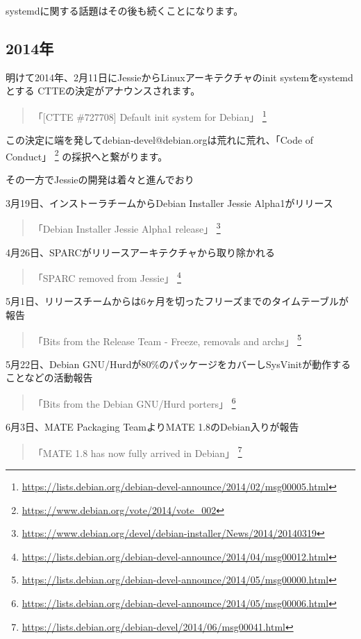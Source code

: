 \documentclass[mingoth,a4paper]{jsarticle}
\begin{document}
systemdに関する話題はその後も続くことになります。


\subsection{2014年}

明けて2014年、2月11日にJessieからLinuxアーキテクチャのinit systemをsystemdとする
CTTEの決定がアナウンスされます。
\begin{quote}
  「[CTTE \#727708] Default init system for Debian」
  \footnote{\url{https://lists.debian.org/debian-devel-announce/2014/02/msg00005.html}}
\end{quote}

この決定に端を発してdebian-devel@debian.orgは荒れに荒れ、「Code of Conduct」
\footnote{\url{https://www.debian.org/vote/2014/vote_002}}
の採択へと繋がります。

その一方でJessieの開発は着々と進んでおり

3月19日、インストーラチームからDebian Installer Jessie Alpha1がリリース
\begin{quote}
  「Debian Installer Jessie Alpha1 release」
  \footnote{\url{https://www.debian.org/devel/debian-installer/News/2014/20140319}}
\end{quote}

4月26日、SPARCがリリースアーキテクチャから取り除かれる
\begin{quote}
  「SPARC removed from Jessie」
  \footnote{\url{https://lists.debian.org/debian-devel-announce/2014/04/msg00012.html}}
\end{quote}

5月1日、リリースチームからは6ヶ月を切ったフリーズまでのタイムテーブルが報告
\begin{quote}
  「Bits from the Release Team - Freeze, removals and archs」
  \footnote{\url{https://lists.debian.org/debian-devel-announce/2014/05/msg00000.html}}
\end{quote}

5月22日、Debian GNU/Hurdが80\%のパッケージをカバーしSysVinitが動作することなどの活動報告
\begin{quote}
  「Bits from the Debian GNU/Hurd porters」
  \footnote{\url{https://lists.debian.org/debian-devel-announce/2014/05/msg00006.html}}
\end{quote}

6月3日、MATE Packaging TeamよりMATE 1.8のDebian入りが報告
\begin{quote}
  「MATE 1.8 has now fully arrived in Debian」
  \footnote{\url{https://lists.debian.org/debian-devel/2014/06/msg00041.html}}
\end{quote}
\end{document}
